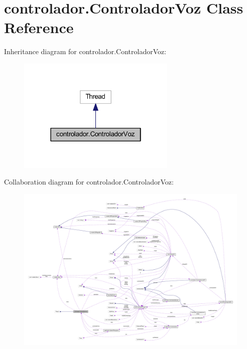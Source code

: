 \hypertarget{classcontrolador_1_1_controlador_voz}{}\section{controlador.\+Controlador\+Voz Class Reference}
\label{classcontrolador_1_1_controlador_voz}


Inheritance diagram for controlador.\+Controlador\+Voz\+:
\nopagebreak
\begin{figure}[H]
\begin{center}
\leavevmode
\includegraphics[width=214pt]{classcontrolador_1_1_controlador_voz__inherit__graph}
\end{center}
\end{figure}


Collaboration diagram for controlador.\+Controlador\+Voz\+:
\nopagebreak
\begin{figure}[H]
\begin{center}
\leavevmode
\includegraphics[width=350pt]{classcontrolador_1_1_controlador_voz__coll__graph}
\end{center}
\end{figure}
